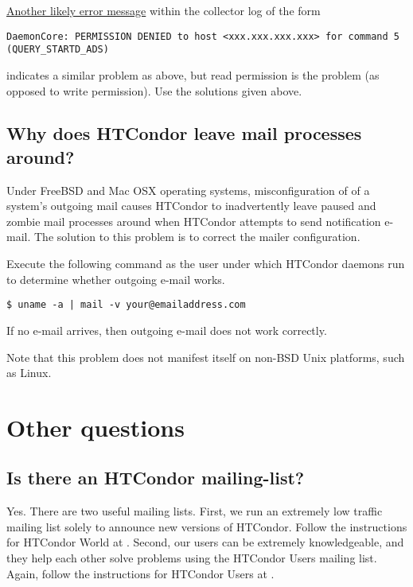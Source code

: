 \underline{Another likely error message} within the collector log of the form
\footnotesize
\begin{verbatim}
DaemonCore: PERMISSION DENIED to host <xxx.xxx.xxx.xxx> for command 5 (QUERY_STARTD_ADS)
\end{verbatim}
\normalsize
indicates a similar problem as above, but read permission
is the problem (as opposed to write permission).
Use the solutions given above.

\subsection*{Why does HTCondor leave mail processes around?}

Under FreeBSD and Mac OSX operating systems,
misconfiguration of of a system's outgoing mail causes
HTCondor to inadvertently leave paused and zombie mail
processes around when HTCondor attempts to send notification e-mail.
The solution to this problem is
to correct the mailer configuration.

Execute the following command as the user under which HTCondor
daemons run to determine whether outgoing e-mail works.

\begin{verbatim}
$ uname -a | mail -v your@emailaddress.com
\end{verbatim}

If no e-mail arrives, then outgoing e-mail does not work
correctly.

Note that this problem does not manifest itself
on non-BSD Unix platforms, such as Linux.

\section{Other questions}


\subsection*{Is there an HTCondor mailing-list?}

Yes. There are two useful mailing lists.
First, we run an extremely low traffic mailing list solely to announce new
versions of HTCondor.
Follow the instructions for HTCondor World at
.
Second, our users can be extremely knowledgeable,
and they help each other solve problems
using the HTCondor Users mailing list.
Again, follow the instructions for HTCondor Users at
.



